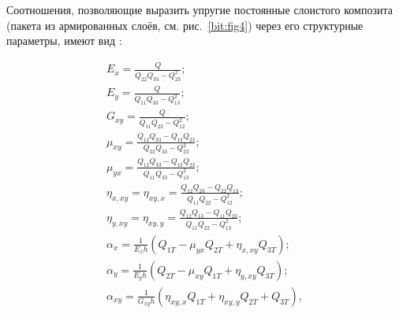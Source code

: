 Соотношения, позволяющие выразить упругие постоянные слоистого композита (пакета из армированных слоёв, см. рис.~\ref{bit:fig4}) через его структурные параметры, имеют вид \cite{bit:bib2, bit:bib11}:

\begin{gather*}



\displaystyle E_x=\frac{Q}{Q_{22}Q_{33}-Q_{23}^2};

\\

\displaystyle E_y=\frac{Q}{Q_{11}Q_{33}-Q_{13}^2};

\\

\displaystyle G_{xy}=\frac{Q}{Q_{11}Q_{22}-Q_{12}^2};

\\

\displaystyle \mu_{xy}=\frac{Q_{12}Q_{33}-Q_{13}Q_{23}}{Q_{22}Q_{33}-Q_{23}^2};

\\

\displaystyle \mu_{yx}=\frac{Q_{12}Q_{33}-Q_{13}Q_{23}}{Q_{11}Q_{33}-Q_{13}^2};

\\

\displaystyle \eta_{x,xy}=\eta_{xy,x}=\frac{Q_{12}Q_{23}-Q_{22}Q_{13}}{Q_{11}Q_{22}-Q_{12}^2};

\\

\displaystyle \eta_{y,xy}=\eta_{xy,y}=\frac{Q_{12}Q_{13}-Q_{11}Q_{23}}{Q_{11}Q_{22}-Q_{13}^2};

\\

\displaystyle \alpha_x=\frac{1}{E_xh}(Q_{1T}-\mu_{yx}Q_{2T}+\eta_{x,xy}Q_{3T});

\\

\displaystyle \alpha_y=\frac{1}{E_yh}(Q_{2T}-\mu_{xy}Q_{1T}+\eta_{y,xy}Q_{3T});

\\

\displaystyle \alpha_{xy}=\frac{1}{G_{xy}h}(\eta_{xy,x}Q_{1T}+\eta_{xy,y}Q_{2T}+Q_{3T}),


\end{gather*}

